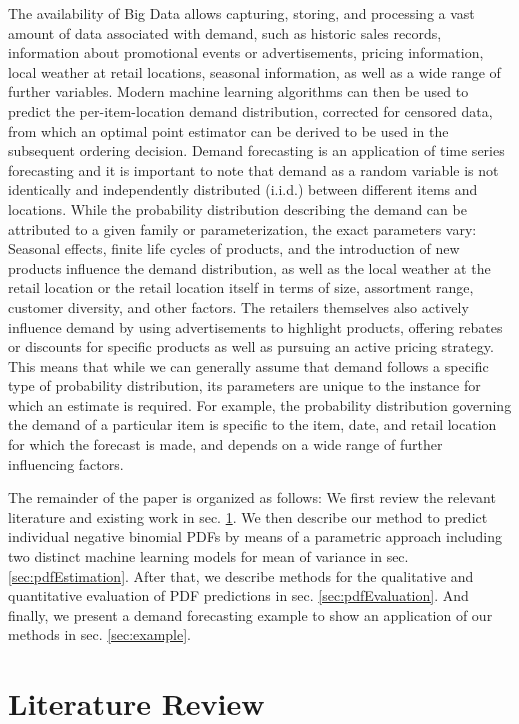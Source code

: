 \documentclass[BCOR=1mm, DIV=calc,10pt,
twoside=true,
twocolumn,
headings=normal]{scrartcl}
\begin{document}
The availability of Big Data allows capturing, storing, and processing a vast amount of data associated with demand, such as historic sales records, information about promotional events or advertisements, pricing information, local weather at retail locations, seasonal information, as well as a wide range of further variables. Modern machine learning algorithms can then be used to predict the per-item-location demand distribution, corrected for censored data, from which an optimal point estimator can be derived to be used in the subsequent ordering decision. Demand forecasting is an application of time series forecasting and it is important to note that demand as a random variable is not identically and independently distributed (i.i.d.) between different items and locations. While the probability distribution describing the demand can be attributed to a given family or parameterization, the exact parameters vary: Seasonal effects, finite life cycles of products, and the introduction of new products influence the demand distribution, as well as the local weather at the retail location or the retail location itself in terms of size, assortment range, customer diversity, and other factors. The retailers themselves also actively influence demand by using advertisements to highlight products, offering rebates or discounts for specific products as well as pursuing an active pricing strategy. This means that while we can generally assume that demand follows a specific type of probability distribution, its parameters are unique to the instance for which an estimate is required. For example, the probability distribution governing the demand of a particular item is specific to the item, date, and retail location for which the forecast is made, and depends on a wide range of further influencing factors.

The remainder of the paper is organized as follows: We first review the relevant literature and existing work in sec. \ref{sec:LitRev}. We then describe our method to predict individual negative binomial PDFs by means of a parametric approach including two distinct machine learning models for mean of variance in sec. \ref{sec:pdfEstimation}. After that, we describe methods for the qualitative and quantitative evaluation of PDF predictions in sec. \ref{sec:pdfEvaluation}. And finally, we present a demand forecasting example to show an application of our methods in sec. \ref{sec:example}.


\section{Literature Review}
\label{sec:LitRev}
\end{document}
